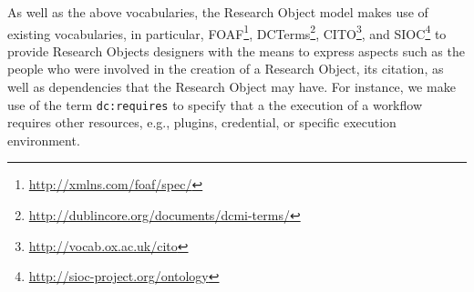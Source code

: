 As well as the above vocabularies, the Research Object model makes use of existing vocabularies, in particular, FOAF\footnote{\url{http://xmlns.com/foaf/spec/}}, DCTerms\footnote{\url{http://dublincore.org/documents/dcmi-terms/}}, CITO\footnote{\url{http://vocab.ox.ac.uk/cito}}, and SIOC\footnote{\url{http://sioc-project.org/ontology}} to provide Research Objects designers with the means to express aspects such as the people who were involved in the creation of a Research Object, its citation, as well as dependencies that the Research Object may have. For instance, we make use of the term \texttt{dc:requires} to specify that a the execution of a workflow requires other resources, e.g., plugins, credential, or specific execution environment.
